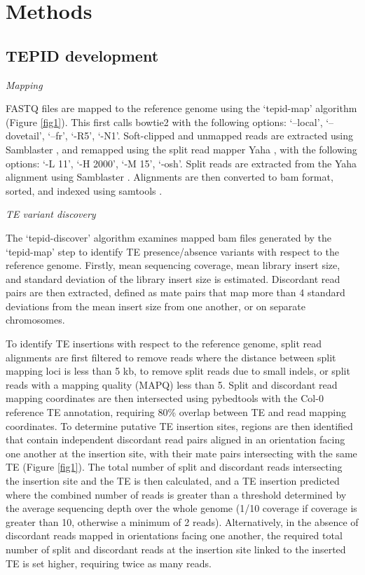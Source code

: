 \documentclass[12pt]{article}
\begin{document}
\section{Methods}

\subsection{TEPID development}

\emph{Mapping}

FASTQ files are mapped to the reference genome using the `tepid-map'
algorithm (Figure \ref{fig1}). This first calls bowtie2 \cite{Langmead:2012jh}
with the following options: `--local', `--dovetail', `--fr', `-R5',
`-N1'. Soft-clipped and unmapped reads are extracted using Samblaster
\cite{Faust:2014hf}, and remapped using the split read mapper Yaha
\cite{Faust:2012ic}, with the following options: `-L 11', `-H 2000', `-M
15', `-osh'. Split reads are extracted from the Yaha alignment using
Samblaster \cite{Faust:2014hf}. Alignments are then converted to bam
format, sorted, and indexed using samtools \cite{Li:2009ka}.

\emph{TE variant discovery}

The `tepid-discover' algorithm examines mapped bam files generated by
the `tepid-map' step to identify TE presence/absence variants with
respect to the reference genome. Firstly, mean sequencing coverage, mean
library insert size, and standard deviation of the library insert size
is estimated. Discordant read pairs are then extracted, defined as mate
pairs that map more than 4 standard deviations from the mean insert size
from one another, or on separate chromosomes.

To identify TE insertions with respect to the reference genome, split
read alignments are first filtered to remove reads where the distance
between split mapping loci is less than 5 kb, to remove split reads
due to small indels, or split reads with a mapping quality (MAPQ) less
than 5. Split and discordant read mapping coordinates are then
intersected using pybedtools \cite{Dale:2011cl, Quinlan:2010km} with
the Col-0 reference TE annotation, requiring 80\% overlap between TE
and read mapping coordinates. To determine putative TE insertion
sites, regions are then identified that contain independent discordant
read pairs aligned in an orientation facing one another at the
insertion site, with their mate pairs intersecting with the same TE
(Figure \ref{fig1}). The total number of split and discordant reads
intersecting the insertion site and the TE is then calculated, and a
TE insertion predicted where the combined number of reads is greater
than a threshold determined by the average sequencing depth over the
whole genome (1/10 coverage if coverage is greater than 10, otherwise
a minimum of 2 reads).  Alternatively, in the absence of discordant
reads mapped in orientations facing one another, the required total
number of split and discordant reads at the insertion site linked to
the inserted TE is set higher, requiring twice as many reads.
\end{document}
